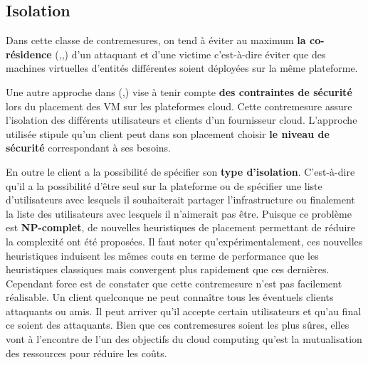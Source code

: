 \subsection{Isolation}
  
Dans cette classe de contremesures, on tend à éviter au maximum \textbf{ la co-résidence} (\cite{Fangfei},\cite{Ris2009},\cite{Zhang2012}) d’un attaquant et d’une victime c’est-à-dire éviter que des machines virtuelles d’entités différentes soient déployées sur la même plateforme. \newline
\par
Une autre approche dans  (\cite{Lyon1},\cite{Lyon2})  vise à tenir compte \textbf{des contraintes de sécurité} lors du placement des VM sur les plateformes cloud. Cette contremesure assure l’isolation des différents utilisateurs et clients d’un fournisseur cloud. L'approche utilisée stipule qu’un client peut dans son placement  choisir \textbf{ le niveau de sécurité} correspondant à ses besoins. \par
En outre le client a la possibilité de spécifier son \textbf{type d’isolation}. C’est-à-dire qu’il a la possibilité d’être seul sur la plateforme ou de spécifier une liste d’utilisateurs avec lesquels il souhaiterait partager l’infrastructure ou finalement la liste des utilisateurs avec lesquels il n’aimerait pas être. Puisque ce problème est \textbf{NP-complet},  de nouvelles heuristiques de placement permettant de réduire la complexité ont été proposées. 
Il faut noter qu'expérimentalement, ces  nouvelles heuristiques induisent les mêmes couts en terme de performance que les  heuristiques classiques mais  convergent plus rapidement que ces dernières. Cependant force est de constater que cette contremesure n’est pas facilement réalisable. Un client quelconque ne peut connaître tous les éventuels clients attaquants ou amis. Il peut arriver qu’il accepte certain utilisateurs et qu’au final ce soient des attaquants.
Bien que ces contremesures soient les plus sûres, elles vont à l’encontre  de l’un des objectifs du cloud computing qu’est la mutualisation des ressources pour réduire les coûts.\newline{}

